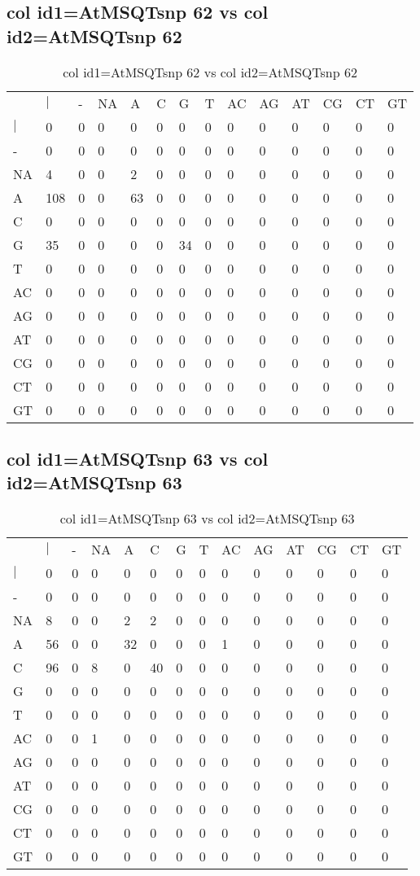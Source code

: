 \subsection{col id1=AtMSQTsnp 62 vs col id2=AtMSQTsnp 62}
\begin{center}
\begin{longtable}{|l|l|l|l|l|l|l|l|l|l|l|l|l|l|}
\caption{col id1=AtMSQTsnp 62 vs col id2=AtMSQTsnp 62} \label{table_dm760}\\
\hline
\\
\hline
&$|$&-&NA&A&C&G&T&AC&AG&AT&CG&CT&GT\\
$|$&0&0&0&0&0&0&0&0&0&0&0&0&0\\
-&0&0&0&0&0&0&0&0&0&0&0&0&0\\
NA&4&0&0&2&0&0&0&0&0&0&0&0&0\\
A&108&0&0&63&0&0&0&0&0&0&0&0&0\\
C&0&0&0&0&0&0&0&0&0&0&0&0&0\\
G&35&0&0&0&0&34&0&0&0&0&0&0&0\\
T&0&0&0&0&0&0&0&0&0&0&0&0&0\\
AC&0&0&0&0&0&0&0&0&0&0&0&0&0\\
AG&0&0&0&0&0&0&0&0&0&0&0&0&0\\
AT&0&0&0&0&0&0&0&0&0&0&0&0&0\\
CG&0&0&0&0&0&0&0&0&0&0&0&0&0\\
CT&0&0&0&0&0&0&0&0&0&0&0&0&0\\
GT&0&0&0&0&0&0&0&0&0&0&0&0&0\\
\hline
\end{longtable}
\end{center}

\subsection{col id1=AtMSQTsnp 63 vs col id2=AtMSQTsnp 63}
\begin{center}
\begin{longtable}{|l|l|l|l|l|l|l|l|l|l|l|l|l|l|}
\caption{col id1=AtMSQTsnp 63 vs col id2=AtMSQTsnp 63} \label{table_dm762}\\
\hline
\\
\hline
&$|$&-&NA&A&C&G&T&AC&AG&AT&CG&CT&GT\\
$|$&0&0&0&0&0&0&0&0&0&0&0&0&0\\
-&0&0&0&0&0&0&0&0&0&0&0&0&0\\
NA&8&0&0&2&2&0&0&0&0&0&0&0&0\\
A&56&0&0&32&0&0&0&1&0&0&0&0&0\\
C&96&0&8&0&40&0&0&0&0&0&0&0&0\\
G&0&0&0&0&0&0&0&0&0&0&0&0&0\\
T&0&0&0&0&0&0&0&0&0&0&0&0&0\\
AC&0&0&1&0&0&0&0&0&0&0&0&0&0\\
AG&0&0&0&0&0&0&0&0&0&0&0&0&0\\
AT&0&0&0&0&0&0&0&0&0&0&0&0&0\\
CG&0&0&0&0&0&0&0&0&0&0&0&0&0\\
CT&0&0&0&0&0&0&0&0&0&0&0&0&0\\
GT&0&0&0&0&0&0&0&0&0&0&0&0&0\\
\hline
\end{longtable}
\end{center}

